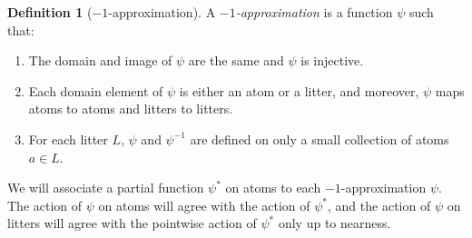 \documentclass{article}
\theoremstyle{definition}
\newtheorem{definition}[theorem]{Definition}
\theoremstyle{remark}
\begin{document}
{\begin{definition}[$-1$-approximation]\label{def:base_approx}
  A {\em $-1$-approximation\/} is a function $\psi$ such that:
  \begin{enumerate}
    \item The domain and image of $\psi$ are the same and $\psi$ is injective.
    \item Each domain element of $\psi$ is either an atom or a litter, and moreover, $\psi$ maps atoms to atoms and litters to litters.
    \item For each litter $L$, $\psi$ and $\psi^{-1}$ are defined on only a small collection of atoms $a \in L$.
  \end{enumerate}
\end{definition}
We will associate a partial function $\psi^*$ on atoms to each $-1$-approximation $\psi$.
The action of $\psi$ on atoms will agree with the action of $\psi^*$, and the action of $\psi$ on litters will agree with the pointwise action of $\psi^*$ only up to nearness.

}
\end{document}

